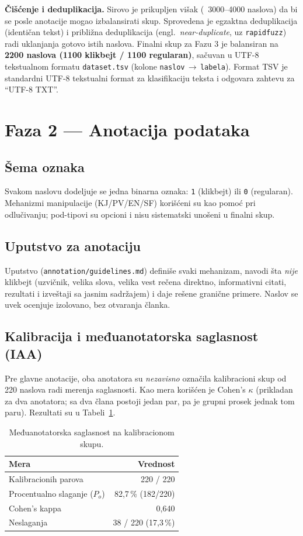 \documentclass[11pt,a4paper]{article}
\begin{document}
\textbf{Čišćenje i deduplikacija.} Sirovo je prikupljen višak (~3000--4000 naslova)
da bi se posle anotacije mogao izbalansirati skup. Sprovedena je egzaktna
deduplikacija (identičan tekst) i približna deduplikacija (engl.\ \emph{near-duplicate},
uz \texttt{rapidfuzz}) radi uklanjanja gotovo istih naslova. Finalni skup za Fazu 3
je balansiran na \textbf{2200 naslova (1100 klikbejt / 1100 regularan)}, sačuvan u
UTF-8 tekstualnom formatu \texttt{dataset.tsv} (kolone \texttt{naslov}\,$\to$\,\texttt{labela}).
Format TSV je standardni UTF-8 tekstualni format za klasifikaciju teksta i odgovara
zahtevu za \enquote{UTF-8 TXT}.

\section{Faza 2 --- Anotacija podataka}\label{sec:faza2}
\subsection{Šema oznaka}
Svakom naslovu dodeljuje se jedna binarna oznaka: \texttt{1} (klikbejt) ili
\texttt{0} (regularan). Mehanizmi manipulacije (KJ/PV/EN/SF) korišćeni su kao pomoć
pri odlučivanju; pod-tipovi su opcioni i nisu sistematski unošeni u finalni skup.

\subsection{Uputstvo za anotaciju}
Uputstvo (\texttt{annotation/guidelines.md}) definiše svaki mehanizam, navodi šta
\emph{nije} klikbejt (uzvičnik, velika slova, velika vest rečena direktno, informativni
citati, rezultati i izveštaji sa jasnim sadržajem) i daje rešene granične primere.
Naslov se uvek ocenjuje izolovano, bez otvaranja članka.

\subsection{Kalibracija i međuanotatorska saglasnost (IAA)}
Pre glavne anotacije, oba anotatora su \emph{nezavisno} označila kalibracioni skup od
220 naslova radi merenja saglasnosti. Kao mera korišćen je Cohen's $\kappa$ (prikladan
za dva anotatora; sa dva člana postoji jedan par, pa je grupni prosek jednak tom
paru). Rezultati su u Tabeli~\ref{tab:iaa}.

\begin{table}[H]\centering
\caption{Međuanotatorska saglasnost na kalibracionom skupu.}\label{tab:iaa}
\begin{tabular}{lr}
\toprule
Mera & Vrednost \\
\midrule
Kalibracionih parova & 220 / 220 \\
Procentualno slaganje ($P_o$) & 82{,}7\,\% (182/220) \\
Cohen's kappa & 0{,}640 \\
Neslaganja & 38 / 220 (17{,}3\,\%) \\
\bottomrule
\end{tabular}
\end{table}
\end{document}
